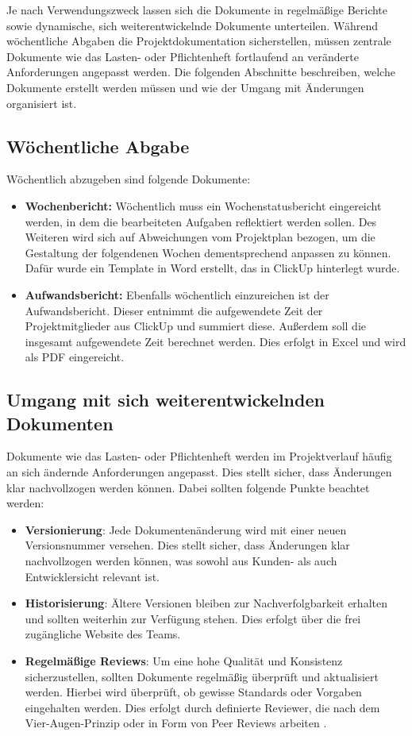 \documentclass[a4paper,12pt]{article}
\begin{document}
Je nach Verwendungszweck lassen sich die Dokumente in regelmäßige Berichte sowie dynamische, sich weiterentwickelnde Dokumente unterteilen. Während wöchentliche Abgaben die Projektdokumentation sicherstellen, müssen zentrale Dokumente wie das Lasten- oder Pflichtenheft fortlaufend an veränderte Anforderungen angepasst werden. Die folgenden Abschnitte beschreiben, welche Dokumente erstellt werden müssen und wie der Umgang mit Änderungen organisiert ist.

\subsection{Wöchentliche Abgabe}
Wöchentlich abzugeben sind folgende Dokumente:
\begin{itemize}
    \item \textbf{Wochenbericht:} Wöchentlich muss ein Wochenstatusbericht eingereicht werden, in dem die bearbeiteten Aufgaben reflektiert werden sollen. Des Weiteren wird sich auf Abweichungen vom Projektplan bezogen, um die Gestaltung der folgendenen Wochen dementsprechend anpassen zu können. Dafür wurde ein Template in Word erstellt, das in ClickUp hinterlegt wurde.
    \item \textbf{Aufwandsbericht:} Ebenfalls wöchentlich einzureichen ist der Aufwandsbericht. Dieser entnimmt die aufgewendete Zeit der Projektmitglieder aus ClickUp und summiert diese. Außerdem soll die insgesamt aufgewendete Zeit berechnet werden. Dies erfolgt in Excel und wird als PDF eingereicht.
\end{itemize}

\subsection{Umgang mit sich weiterentwickelnden Dokumenten}
Dokumente wie das Lasten- oder Pflichtenheft werden im Projektverlauf häufig an sich ändernde Anforderungen angepasst. Dies stellt sicher, dass Änderungen klar nachvollzogen werden können. Dabei sollten folgende Punkte beachtet werden:
\begin{itemize}
    \item \textbf{Versionierung}: Jede Dokumentenänderung wird mit einer neuen Versionsnummer versehen. Dies stellt sicher, dass Änderungen klar nachvollzogen werden können, was sowohl aus Kunden- als auch Entwicklersicht relevant ist.
    \item \textbf{Historisierung}: Ältere Versionen bleiben zur Nachverfolgbarkeit erhalten und sollten weiterhin zur Verfügung stehen. Dies erfolgt über die frei zugängliche Website des Teams.
    \item \textbf{Regelmäßige Reviews}: Um eine hohe Qualität und Konsistenz sicherzustellen, sollten Dokumente regelmäßig überprüft und aktualisiert werden. Hierbei wird überprüft, ob gewisse Standards oder Vorgaben eingehalten werden. Dies erfolgt durch definierte Reviewer, die nach dem Vier-Augen-Prinzip oder in Form von Peer Reviews arbeiten \cite{studysmarter_dokumentationsreview_nodate}.
\end{itemize}
\end{document}
